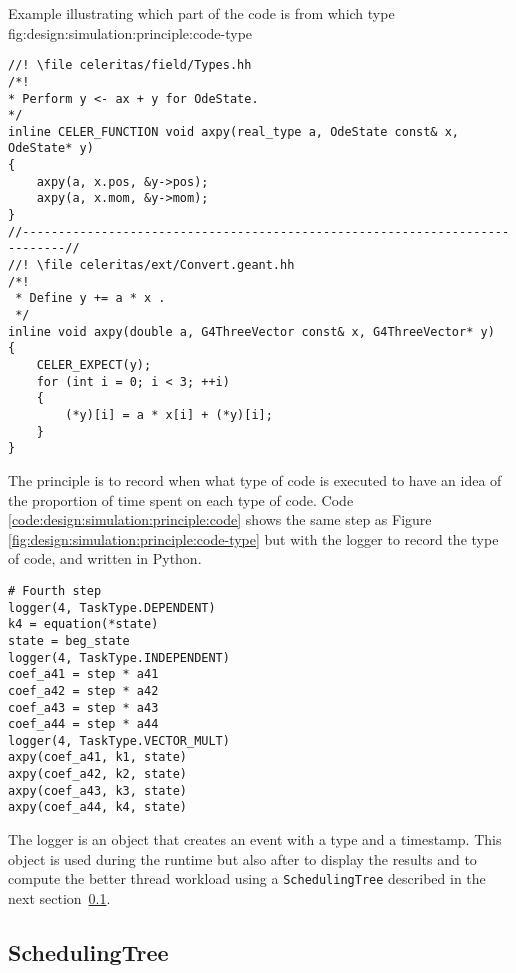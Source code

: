         {Example illustrating which part of the code is from which type}
        {fig:design:simulation:principle:code-type}

\begin{code}
    \label{code:design:simulation:principle:axpy}
    \begin{verbatim}
//! \file celeritas/field/Types.hh
/*!
* Perform y <- ax + y for OdeState.
*/
inline CELER_FUNCTION void axpy(real_type a, OdeState const& x, OdeState* y)
{
    axpy(a, x.pos, &y->pos);
    axpy(a, x.mom, &y->mom);
}
//----------------------------------------------------------------------------//
//! \file celeritas/ext/Convert.geant.hh
/*!
 * Define y += a * x .
 */
inline void axpy(double a, G4ThreeVector const& x, G4ThreeVector* y)
{
    CELER_EXPECT(y);
    for (int i = 0; i < 3; ++i)
    {
        (*y)[i] = a * x[i] + (*y)[i];
    }
}
    \end{verbatim}
\end{code}

The principle is to record when  what type of code is executed to have an idea of
the proportion of time spent on each type of code.
Code \ref{code:design:simulation:principle:code} shows the same step as
Figure \ref{fig:design:simulation:principle:code-type} but with the
logger to record the type of code, and written in Python.

\begin{code}
    \label{code:design:simulation:principle:code}
    \begin{verbatim}
# Fourth step
logger(4, TaskType.DEPENDENT)
k4 = equation(*state)
state = beg_state
logger(4, TaskType.INDEPENDENT)
coef_a41 = step * a41
coef_a42 = step * a42
coef_a43 = step * a43
coef_a44 = step * a44
logger(4, TaskType.VECTOR_MULT)
axpy(coef_a41, k1, state)
axpy(coef_a42, k2, state)
axpy(coef_a43, k3, state)
axpy(coef_a44, k4, state)
    \end{verbatim}
\end{code}

The logger is an object that creates an event with a type and a timestamp.
This object is used during the runtime but also after to display the results and
to compute the better thread workload using a \texttt{SchedulingTree} described
in the next section~\ref{ch:design:simulation:scheduling}.

\subsection{SchedulingTree}
\label{ch:design:simulation:scheduling}

